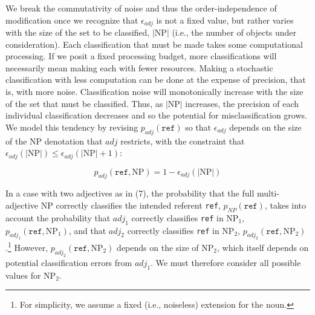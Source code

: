 \documentclass[preprint,authoryear]{elsarticle}\frenchspacing
\newcommand{\gcs}[1]{\textcolor{blue}{[gcs: #1]}}
\begin{document}
We break the commutativity of noise and thus the order-independence of modification once we recognize that $\epsilon_{adj}$ is not a fixed value, but rather varies with the size of the set to be classified, $|\textrm{NP}|$ (i.e., the number of objects under consideration). Each classification that must be made takes some computational processing. If we posit a fixed processing budget, more classifications will necessarily mean making each with fewer resources. Making a stochastic classification with less computation can be done at the expense of precision, that is, with more noise. Classification noise will monotonically increase with the size of the set that must be classified.
Thus, as $|\textrm{NP}|$ increases, the precision of each individual classification decreases and so the potential for misclassification grows. We model this tendency by revising $p_{adj}(\texttt{ref})$ so that $\epsilon_{adj}$ depends on the size of the NP denotation that $adj$ restricts, with the constraint that $\epsilon_{adj}(|\textrm{NP}|) \leq \epsilon_{adj}(|\textrm{NP}|+1)$:

\begin{equation}
p_{adj}(\texttt{ref},\textrm{NP}) = 1-\epsilon_{adj}(|\textrm{NP}|)
\end{equation}


In a case with two adjectives as in (7), the probability that the full multi-adjective NP correctly classifies the intended referent \texttt{ref}, $p_{N\!P}(\texttt{ref})$, takes into account the probability that $adj_1$ correctly classifies \texttt{ref} in NP$_1$, $p_{adj_1}(\texttt{ref},\textrm{NP}_1)$, and that $adj_2$ correctly classifies \texttt{ref} in NP$_2$, $p_{adj_2}(\texttt{ref},\textrm{NP}_2)$.\footnote{For simplicity, we assume a fixed (i.e., noiseless) extension for the noun.} However, $p_{adj_2}(\texttt{ref},\textrm{NP}_2)$ depends on the size of NP$_2$, which itself depends on potential classification errors from $adj_1$. We must therefore consider all possible values for NP$_2$.
\end{document}
